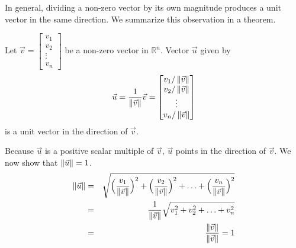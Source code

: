 \documentclass{ximera}
\begin{document}
 
\begin{center}
\end{center}
 
In general, dividing a non-zero vector by its own magnitude produces a unit vector in the same direction.  We summarize this observation in a theorem.


 
 
  \begin{theorem}\label{th:unit} Let $\vec{v}=\begin{bmatrix}v_1\\v_2\\\vdots\\v_n\end{bmatrix}$ be a non-zero vector in $\mathbb{R}^n$. Vector $\vec{u}$ given by
  \begin{equation*}
 \vec{u}=\frac{1}{\left\|\vec{v}\right\|}\vec{v}=\begin{bmatrix}v_1/\left\|\vec{v}\right\|\\v_2/\left\|\vec{v}\right\|\\\vdots\\v_n/\left\|\vec{v}\right\|\end{bmatrix}
\end{equation*}
is a unit vector in the direction of $\vec{v}$.

Because $\vec{u}$ is a positive scalar multiple of $\vec{v}$, $\vec{u}$ points in the direction of $\vec{v}$.  We now show that $\left\|\vec{u}\right\|=1$.
\begin{eqnarray*}
\left\|\vec{u}\right\|&=&\sqrt{ \Big(\frac{v_1}{\left\|\vec{v}\right\|}\Big)^2+\Big(\frac{v_2}{\left\|\vec{v}\right\|}\Big)^2+\ldots +\Big(\frac{v_n}{\left\|\vec{v}\right\|}\Big)^2}\\
&=&\frac{1}{\left\|\vec{v}\right\|}\sqrt{v_1^2+v_2^2+\ldots +v_n^2}\\
&=&\frac{\left\|\vec{v}\right\|}{\left\|\vec{v}\right\|}=1
\end{eqnarray*}
\end{theorem}
\end{document}
